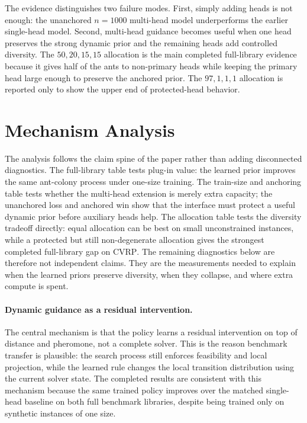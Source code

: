 \documentclass[11pt]{article}
\newcommand{\CVRP}{\textsc{CVRP}}
\begin{document}
The evidence distinguishes two failure modes.
First, simply adding heads is not enough: the unanchored $n=1000$ multi-head model underperforms the earlier single-head model.
Second, multi-head guidance becomes useful when one head preserves the strong dynamic prior and the remaining heads add controlled diversity.
The $50,20,15,15$ allocation is the main completed full-library evidence because it gives half of the ants to non-primary heads while keeping the primary head large enough to preserve the anchored prior.
The $97,1,1,1$ allocation is reported only to show the upper end of protected-head behavior.

\section{Mechanism Analysis}
\label{sec:analysis-plan}

The analysis follows the claim spine of the paper rather than adding disconnected diagnostics.
The full-library table tests plug-in value: the learned prior improves the same ant-colony process under one-size training.
The train-size and anchoring table tests whether the multi-head extension is merely extra capacity; the unanchored loss and anchored win show that the interface must protect a useful dynamic prior before auxiliary heads help.
The allocation table tests the diversity tradeoff directly: equal allocation can be best on small unconstrained instances, while a protected but still non-degenerate allocation gives the strongest completed full-library gap on \CVRP{}.
The remaining diagnostics below are therefore not independent claims.
They are the measurements needed to explain when the learned priors preserve diversity, when they collapse, and where extra compute is spent.

\paragraph{Dynamic guidance as a residual intervention.}
The central mechanism is that the policy learns a residual intervention on top of distance and pheromone, not a complete solver.
This is the reason benchmark transfer is plausible: the search process still enforces feasibility and local projection, while the learned rule changes the local transition distribution using the current solver state.
The completed results are consistent with this mechanism because the same trained policy improves over the matched single-head baseline on both full benchmark libraries, despite being trained only on synthetic instances of one size.
\end{document}
